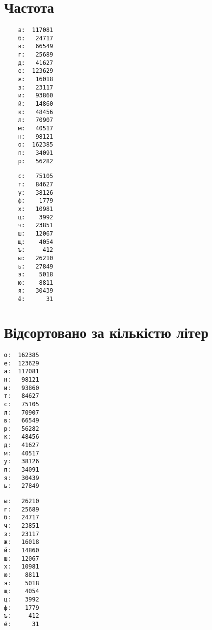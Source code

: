 \documentclass{article}
\begin{document}
\newpage
\section{Частота}

\normalsize
\begin{minipage}[t]{.5\textwidth}
	\begin{verbatim}
	а:  117081
	б:   24717
	в:   66549
	г:   25689
	д:   41627
	е:  123629
	ж:   16018
	з:   23117
	и:   93860
	й:   14860
	к:   48456
	л:   70907
	м:   40517
	н:   98121
	о:  162385
	п:   34091
	р:   56282
	\end{verbatim}
\end{minipage}%
\begin{minipage}[t]{.5\textwidth}
\begin{verbatim}
	с:   75105
	т:   84627
	у:   38126
	ф:    1779
	х:   10981
	ц:    3992
	ч:   23851
	ш:   12067
	щ:    4054
	ъ:     412
	ы:   26210
	ь:   27849
	э:    5018
	ю:    8811
	я:   30439
	ё:      31
\end{verbatim}
\end{minipage}

\section{Відсортовано за кількістю літер}
\begin{minipage}[t]{.5\textwidth}
	\begin{verbatim}
о:  162385
е:  123629
а:  117081
н:   98121
и:   93860
т:   84627
с:   75105
л:   70907
в:   66549
р:   56282
к:   48456
д:   41627
м:   40517
у:   38126
п:   34091
я:   30439
ь:   27849
	\end{verbatim}
\end{minipage}%
\begin{minipage}[t]{.5\textwidth}
	\begin{verbatim}
ы:   26210
г:   25689
б:   24717
ч:   23851
з:   23117
ж:   16018
й:   14860
ш:   12067
х:   10981
ю:    8811
э:    5018
щ:    4054
ц:    3992
ф:    1779
ъ:     412
ё:      31
	\end{verbatim}
\end{minipage}

\newpage
\end{document}
